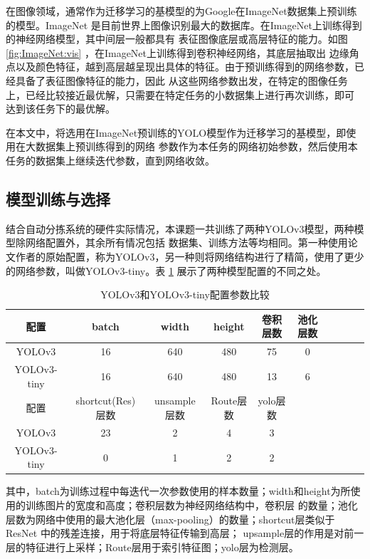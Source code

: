 在图像领域，通常作为迁移学习的基模型的为Google在ImageNet数据集上预训练的模型。ImageNet
是目前世界上图像识别最大的数据库。在ImageNet上训练得到的神经网络模型，其中间层一般都具有
表征图像底层或高层特征的能力。如图 \cite{ImageNet_vis} \ref{fig:ImageNet:vis} ，在ImageNet上训练得到卷积神经网络，其底层抽取出
边缘角点以及颜色特征，越到高层越呈现出具体的特征。由于预训练得到的网络参数，已经具备了表征图像特征的能力，因此
从这些网络参数出发，在特定的图像任务上，已经比较接近最优解，只需要在特定任务的小数据集上进行再次训练，即可
达到该任务下的最优解。



在本文中，将选用在ImageNet预训练的YOLO模型作为迁移学习的基模型，即使用在大数据集上预训练得到的网络
参数作为本任务的网络初始参数，然后使用本任务的数据集上继续迭代参数，直到网络收敛。






\subsection{模型训练与选择}
结合自动分拣系统的硬件实际情况，本课题一共训练了两种YOLOv3模型，两种模型除网络配置外，其余所有情况包括
数据集、训练方法等均相同。第一种使用论文作者的原始配置，称为YOLOv3，另一种则将网络结构进行了精简，使用了更少
的网络参数，叫做YOLOv3-tiny。表 \ref{table:model:config} 展示了两种模型配置的不同之处。

{
    \begin{table}[htb] 
        \caption{YOLOv3和YOLOv3-tiny配置参数比较}
        \label{table:model:config}
        \centering
        \begin{tabular}[t]{c|c|c|c|c|cc|c|c|c}
            \hline
            配置 & batch & width & height & 卷积层数 & 池化层数  \\
            \hline
            YOLOv3 & 16 & 640 & 480 & 75 & 0 \\
            \hline
            YOLOv3-tiny & 16 & 640 & 480 & 13 & 6 \\
            \hline
            配置 & shortcut(Res)层数 & unsample层数 & Route层数 & yolo层数\\
            \hline
            YOLOv3 & 23 & 2 & 4 & 3\\
            \hline
            YOLOv3-tiny & 0 & 1 & 2 & 2\\
            \hline
        \end{tabular}
    \end{table}
}

其中，batch为训练过程中每迭代一次参数使用的样本数量；width和height为所使用的训练图片的宽度和高度；卷积层数为神经网络结构中，卷积层
的数量；池化层数为网络中使用的最大池化层（max-pooling）的数量；shortcut层类似于ResNet \cite{ResNet}中的残差连接，用于将底层特征传输到高层；
upsample层的作用是对前一层的特征进行上采样；Route层用于索引特征图；yolo层为检测层。

